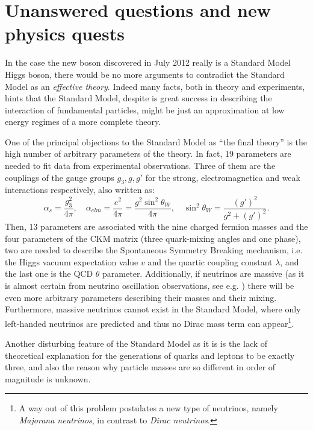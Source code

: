 
\section{Unanswered questions and new physics quests}\label{sec:THquest}

In the case the new boson discovered in July 2012 
really is a Standard Model Higgs boson, there would
be no more arguments to contradict the Standard Model
as an {\it effective theory}. Indeed many facts, both 
in theory and experiments, hints that the Standard Model,
despite is great success in describing the interaction
of fundamental particles, might be just an approximation
at low energy regimes of a more complete theory.

One of the principal objections to the Standard Model as 
``the final theory'' is the high number of arbitrary parameters 
of the theory. In fact, 19 parameters are needed to fit 
data from experimental observations. 
Three of them  are the couplings of the gauge groups 
$g_3, g, g'$ for the strong, electromagnetica and weak 
interactions respectively, also written as: 
\begin{equation}\label{eq:couplings}
\alpha_{s}=\dfrac{g_{3}^{2}}{4\pi} ,\quad 
\alpha_{elm} = \dfrac{e^{2}}{4\pi} =  \dfrac{g^{2}\sin^{2}\theta_{W}}{4\pi}, 
\quad \sin^{2}\theta_{W} = \dfrac{(g')^{2}}{g^{2}+(g')^{2}}.
\end{equation}
Then, 13 parameters are associated with the nine charged 
fermion masses and the four parameters of the CKM matrix 
(three quark-mixing angles and one phase), 
two are needed to describe the Spontaneous Symmetry Breaking mechanism, 
i.e. the Higgs vacuum expectation value $v$ and 
the quartic coupling constant $\lambda$, and the last one is the 
QCD $\theta$ parameter. Additionally, if neutrinos are massive 
(as it is almost certain from neutrino oscillation observations, 
see e.g. \cite{Langacker:817840}) there will be even more arbitrary 
parameters describing their masses and their mixing. 
Furthermore, massive neutrinos cannot exist in the Standard
Model, where only left-handed neutrinos are predicted and thus
no Dirac mass term can appear\footnote{A way out of this
problem postulates a new type of neutrinos, namely 
{\it Majorana neutrinos}, in contrast to {\it Dirac neutrinos}.}.


Another disturbing feature of the Standard Model as it is 
is the lack of theoretical explanation for the generations 
of quarks and leptons to be exactly three, and also the 
reason why particle masses are so different in order of 
magnitude is unknown. 

